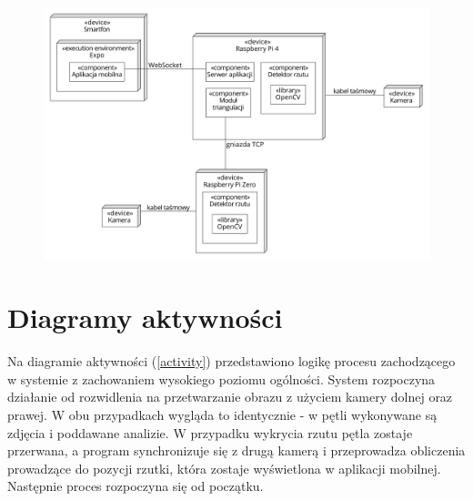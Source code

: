 \begin{figure}[h!]
\begin{center}
\includegraphics[width=\textwidth]{obrazki/deployment.pdf}
\end{center}
\label{deployment}
\end{figure}

\section{Diagramy aktywności}
Na diagramie aktywności (\ref{activity}) przedstawiono logikę procesu zachodzącego w systemie z zachowaniem wysokiego poziomu ogólności. System rozpoczyna działanie od rozwidlenia na przetwarzanie obrazu z użyciem kamery dolnej oraz prawej. W obu przypadkach wygląda to identycznie - w pętli wykonywane są zdjęcia i poddawane analizie. W przypadku wykrycia rzutu pętla zostaje przerwana, a program synchronizuje się z drugą kamerą i przeprowadza obliczenia prowadzące do pozycji rzutki, która zostaje wyświetlona w aplikacji mobilnej. Następnie proces rozpoczyna się od początku.

